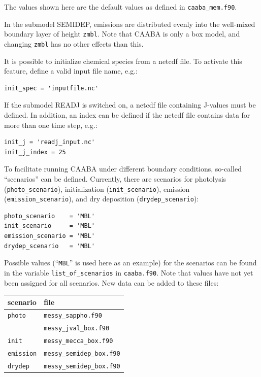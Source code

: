 \documentclass[twoside]{article}
\begin{document}
The values shown here are the default values as defined in
\verb|caaba_mem.f90|.

In the submodel SEMIDEP, emissions are distributed evenly into the
well-mixed boundary layer of height \verb|zmbl|. Note that CAABA is only
a box model, and changing \verb|zmbl| has no other effects than this.

It is possible to initialize chemical species from a netcdf file. To
activate this feature, define a valid input file name, e.g.:

\begin{verbatim}
init_spec = 'inputfile.nc'
\end{verbatim}

If the submodel READJ is switched on, a netcdf file containing J-values
must be defined. In addition, an index can be defined if the netcdf file
contains data for more than one time step, e.g.:

\begin{verbatim}
init_j = 'readj_input.nc'
init_j_index = 25
\end{verbatim}

To facilitate running CAABA under different boundary conditions,
so-called ``scenarios'' can be defined. Currently, there are scenarios
for photolysis (\verb|photo_scenario|), initialization
(\verb|init_scenario|), emission (\verb|emission_scenario|), and dry
deposition (\verb|drydep_scenario|):

\begin{verbatim}
photo_scenario    = 'MBL'
init_scenario     = 'MBL'
emission_scenario = 'MBL'
drydep_scenario   = 'MBL'
\end{verbatim}

Possible values (``\verb|MBL|'' is used here as an example) for the
scenarios can be found in the variable \verb|list_of_scenarios| in
\verb|caaba.f90|. Note that values have not yet been assigned for all
scenarios. New data can be added to these files:

\begin{center}  
  \begin{tabular}{ll}
    \hline
    scenario & file\\
    \hline
    \verb|photo|    & \verb|messy_sappho.f90|\\
                    & \verb|messy_jval_box.f90|\\
    \verb|init|     & \verb|messy_mecca_box.f90|\\
    \verb|emission| & \verb|messy_semidep_box.f90|\\
    \verb|drydep|   & \verb|messy_semidep_box.f90|\\
    \hline
  \end{tabular}
\end{center}
\end{document}

